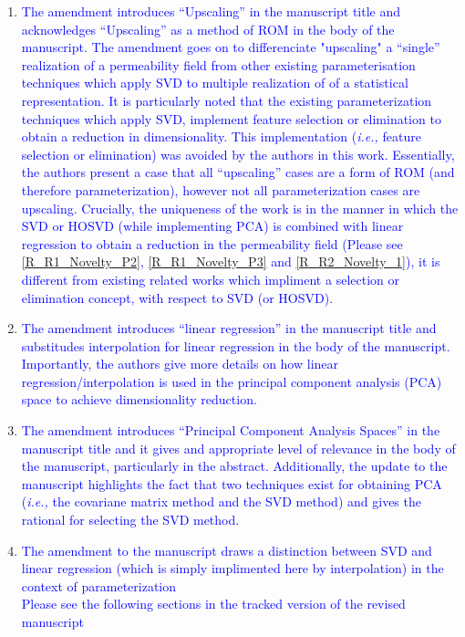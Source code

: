 \documentclass[11pt]{letter} %
\newcommand{\blue}{\textcolor{blue}}
\newcommand{\ie}{{\it i.e., }}
\begin{document}
\begin{letter}
{\begin{enumerate}
\begin{enumerate}
\begin{enumerate}
      \item \label{R_R1_Novelty_P1} \blue{The amendment introduces ``Upscaling'' in the manuscript title and acknowledges ``Upscaling'' as a method of ROM in the body of the manuscript. The amendment goes on to differenciate "upscaling" a ``single'' realization of a permeability field from other existing parameterisation techniques which apply SVD to multiple realization of of a statistical representation. It is particularly noted that the existing parameterization techniques which apply SVD, implement feature selection or elimination to obtain a reduction in dimensionality. This implementation (\ie feature selection or elimination) was avoided by the authors in this work. Essentially, the authors present a case that all ``upscaling'' cases are a form of ROM (and therefore parameterization), however not all parameterization cases are upscaling. Crucially, the uniqueness of the work is in the manner in which the SVD or HOSVD (while implementing PCA) is combined with linear regression to obtain a reduction in the permeability field (Please see \ref{R_R1_Novelty_P2}, \ref{R_R1_Novelty_P3} and \ref{R_R2_Novelty_1}), it is different from existing related works which impliment a selection or elimination concept, with respect to SVD (or HOSVD).}
      \item \label{R_R1_Novelty_P2} \blue {The amendment introduces ``linear regression'' in the manuscript title and substitudes interpolation for linear regression in the body of the manuscript. Importantly, the authors give more details on how linear regression/interpolation is used in the principal component analysis (PCA) space to achieve dimensionality reduction.}
      \item \label{R_R1_Novelty_P3} \blue{The amendment introduces ``Principal Component Analysis Spaces'' in the manuscript title and it gives and appropriate level of relevance in the body of the manuscript, particularly in the abstract. Additionally, the update to the manuscript highlights the fact that two techniques exist for obtaining PCA (\ie {the covariane matrix method and the SVD method}) and gives the rational for selecting the SVD method.}
      \item \label{R_R1_Novelty_P4} \blue{The amendment to the manuscript draws a distinction between SVD and linear regression (which is simply implimented here by interpolation) in the context of parameterization}\\
        \blue{Please see the following sections in the tracked version of the revised manuscript}

\end{enumerate}
\end{enumerate}
\end{enumerate}}
\end{letter}
\end{document}
